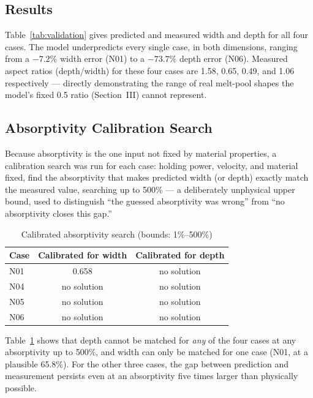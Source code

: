\documentclass[10pt,journal]{IEEEtran}
\begin{document}
\subsection{Results}

Table~\ref{tab:validation} gives predicted and measured width and depth for all four cases. The model underpredicts every single case, in both dimensions, ranging from a $-7.2\%$ width error (N01) to a $-73.7\%$ depth error (N06). Measured aspect ratios (depth/width) for these four cases are 1.58, 0.65, 0.49, and 1.06 respectively --- directly demonstrating the range of real melt-pool shapes the model's fixed 0.5 ratio (Section~III) cannot represent.

\subsection{Absorptivity Calibration Search}

Because absorptivity is the one input not fixed by material properties, a calibration search was run for each case: holding power, velocity, and material fixed, find the absorptivity that makes predicted width (or depth) exactly match the measured value, searching up to 500\% --- a deliberately unphysical upper bound, used to distinguish ``the guessed absorptivity was wrong'' from ``no absorptivity closes this gap.''

\begin{table}[!t]
\centering
\caption{Calibrated absorptivity search (bounds: 1\%--500\%)}
\label{tab:calibration}
\begin{tabular}{@{}lcc@{}}
\toprule
Case & Calibrated for width & Calibrated for depth \\
\midrule
N01 & 0.658 & no solution \\
N04 & no solution & no solution \\
N05 & no solution & no solution \\
N06 & no solution & no solution \\
\bottomrule
\end{tabular}
\end{table}

Table~\ref{tab:calibration} shows that depth cannot be matched for \emph{any} of the four cases at any absorptivity up to 500\%, and width can only be matched for one case (N01, at a plausible 65.8\%). For the other three cases, the gap between prediction and measurement persists even at an absorptivity five times larger than physically possible.
\end{document}
